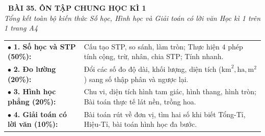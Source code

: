 \documentclass[14pt,a4paper,oneside]{extbook}
\begin{document}
\noindent
\begin{tcolorbox}[
  enhanced,
  colback=teal!8!white,
  colframe=teal!80!black,
  arc=3mm,
  boxrule=1.1pt,
  width=\linewidth,
  halign=center,
  top=2.2mm, bottom=2.2mm,
  left=3mm, right=3mm,
  drop fuzzy shadow
]
  {\large\bfseries\color{teal!95!black}\faBookmark\ BÀI 35. ÔN TẬP CHUNG HỌC KÌ 1}\\[2pt]
  {\scriptsize\color{black!75}\itshape Tổng kết toàn bộ kiến thức Số học, Hình học và Giải toán có lời văn Học kì 1 trên 1 trang A4}
\end{tcolorbox}

\vspace{3.2mm}
\noindent
\begin{tcolorbox}[
  enhanced,
  title={\footnotesize\bfseries\color{white}\faGraduationCap\ 1. Ma trận kiến thức trọng tâm Đề thi Học kì 1 Toán 5},
  colback=blue!2!white,
  colframe=blue!75!black,
  arc=2.5mm, boxrule=0.8pt, top=1.8mm, bottom=1.8mm, left=2.5mm, right=2.5mm
]
  \footnotesize
  \begin{tabular}{ll}
    $\bullet$ \textbf{1. Số học và STP (50\%):} & Cấu tạo STP, so sánh, làm tròn; Thực hiện $4$ phép tính cộng, trừ, nhân, chia STP; Tính nhanh.\\
    $\bullet$ \textbf{2. Đo lường (20\%):} & Đổi các số đo độ dài, khối lượng, diện tích ($\text{km}^2, \text{ha}, \text{m}^2$) sang số thập phân và ngược lại.\\
    $\bullet$ \textbf{3. Hình học phẳng (20\%):} & Chu vi, diện tích hình tam giác, hình thang, hình tròn; Bài toán thực tế lát nền, trồng hoa.\\
    $\bullet$ \textbf{4. Giải toán có lời văn (10\%):} & Bài toán rút về đơn vị, tìm hai số khi biết Tổng-Tỉ, Hiệu-Tỉ, bài toán hình học đa bước.
  \end{tabular}
\end{tcolorbox}

\vspace{3mm}
\end{document}

